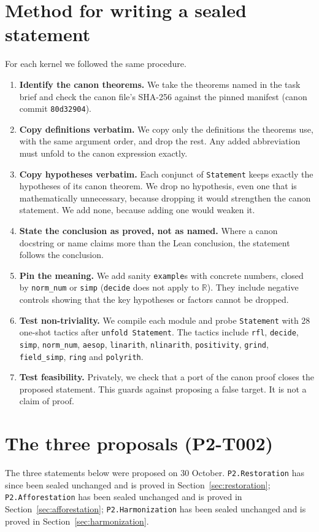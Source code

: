 \documentclass[11pt]{article}
\theoremstyle{definition}
\theoremstyle{remark}
\begin{document}
\section{Method for writing a sealed statement}
For each kernel we followed the same procedure.
\begin{enumerate}
\item \textbf{Identify the canon theorems.} We take the theorems named in the task brief and check the canon file's SHA-256
against the pinned manifest (canon commit \texttt{80d32904}).
\item \textbf{Copy definitions verbatim.} We copy only the definitions the theorems use, with the same argument order,
and drop the rest. Any added abbreviation must unfold to the canon expression exactly.
\item \textbf{Copy hypotheses verbatim.} Each conjunct of \texttt{Statement} keeps exactly the hypotheses of its canon theorem.
We drop no hypothesis, even one that is mathematically unnecessary, because dropping it would strengthen the canon statement.
We add none, because adding one would weaken it.
\item \textbf{State the conclusion as proved, not as named.} Where a canon docstring or name claims more than the Lean
conclusion, the statement follows the conclusion.
\item \textbf{Pin the meaning.} We add sanity \texttt{example}s with concrete numbers, closed by \texttt{norm\_num} or \texttt{simp}
(\texttt{decide} does not apply to $\mathbb{R}$). They include negative controls showing that the key hypotheses or factors cannot be dropped.
\item \textbf{Test non-triviality.} We compile each module and probe \texttt{Statement} with 28 one-shot tactics
after \texttt{unfold Statement}. The tactics include \texttt{rfl}, \texttt{decide}, \texttt{simp}, \texttt{norm\_num}, \texttt{aesop},
\texttt{linarith}, \texttt{nlinarith}, \texttt{positivity}, \texttt{grind}, \texttt{field\_simp}, \texttt{ring} and \texttt{polyrith}.
\item \textbf{Test feasibility.} Privately, we check that a port of the canon proof closes the proposed statement.
This guards against proposing a false target. It is not a claim of proof.
\end{enumerate}

\section{The three proposals (P2-T002)}\label{sec:proposals}
The three statements below were proposed on 30 October. \texttt{P2.Restoration} has since been sealed unchanged and is proved in
Section~\ref{sec:restoration}; \texttt{P2.Afforestation} has been sealed unchanged and is proved in
Section~\ref{sec:afforestation}; \texttt{P2.Harmonization} has been sealed unchanged and is proved in
Section~\ref{sec:harmonization}.
\end{document}
